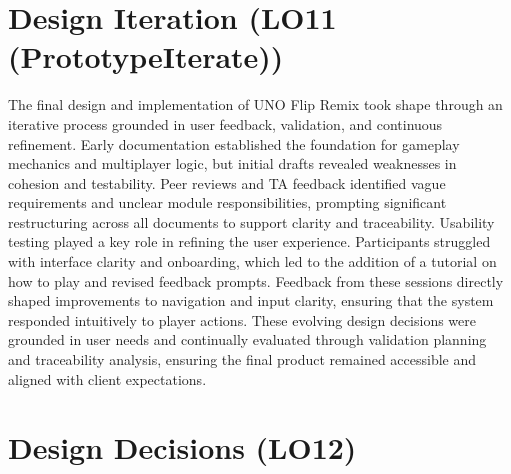 \documentclass{article}
\begin{document}


\section{Design Iteration (LO11 (PrototypeIterate))}
The final design and implementation of UNO Flip Remix took shape through an iterative process grounded in user feedback, validation, and continuous refinement. Early documentation established the foundation for gameplay mechanics and multiplayer logic, but initial drafts revealed weaknesses in cohesion and testability. Peer reviews and TA feedback identified vague requirements and unclear module responsibilities, prompting significant restructuring across all documents to support clarity and traceability. Usability testing played a key role in refining the user experience. Participants struggled with interface clarity and onboarding, which led to the addition of a tutorial on how to play and revised feedback prompts. Feedback from these sessions directly shaped improvements to navigation and input clarity, ensuring that the system responded intuitively to player actions. These evolving design decisions were grounded in user needs and continually evaluated through validation planning and traceability analysis, ensuring the final product remained accessible and aligned with client expectations.




\section{Design Decisions (LO12)}
\end{document}
